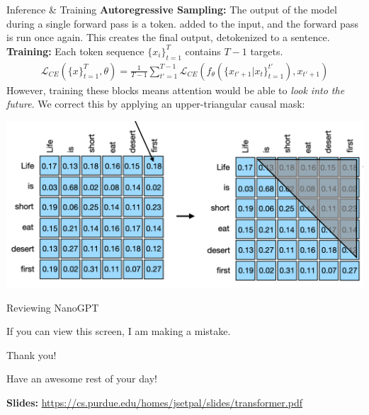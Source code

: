 \documentclass{beamer}
\begin{document}
\begin{frame}{Inference \& Training}
	\textbf{Autoregressive Sampling:} The output of the model during a single forward pass is a token. added to the input, and the forward pass is run once again. This creates the final output, detokenized to a sentence. \pause \newline \\

	\textbf{Training:} Each token sequence $\{x_i\}^T_{t=1}$ contains $T-1$ targets.
	\begin{gather}
		\mathcal{L}_{CE}(\{x\}^T_{t=1}, \theta) = \frac{1}{T-1}\sum^{T-1}_{t' = 1} \mathcal{L}_{CE}(f_\theta(\{x_{t'+1} | x_t\}^{t'}_{t=1}), x_{t' + 1})
	\end{gather} \pause
	However, training these blocks means attention would be able to \textit{look into the future}. \pause We correct this by applying an upper-triangular causal mask:

	\begin{center}
		\includegraphics[width=.5\textwidth]{img/causal-mask.png}
	\end{center}
\end{frame}

\begin{frame}{Reviewing NanoGPT}
	\begin{center}
		If you can view this screen, I am making a mistake.
	\end{center}
\end{frame}

\begin{frame}{Thank you!}
	\begin{center}
		Have an awesome rest of your day!
	\end{center}
	\begin{center}
		\textbf{Slides:} {\small \url{https://cs.purdue.edu/homes/jsetpal/slides/transformer.pdf}}
	\end{center}
\end{frame}
\end{document}
